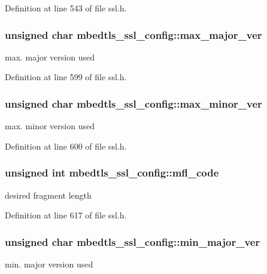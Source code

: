 Definition at line 543 of file ssl.\-h.

\hypertarget{structmbedtls__ssl__config_a10a7ca31f5096d71fc9effbe004d3fd8}{
\subsubsection[{max\-\_\-major\-\_\-ver}]{\setlength{\rightskip}{0pt plus 5cm}unsigned char mbedtls\-\_\-ssl\-\_\-config\-::max\-\_\-major\-\_\-ver}}\label{structmbedtls__ssl__config_a10a7ca31f5096d71fc9effbe004d3fd8}
max. major version used 

Definition at line 599 of file ssl.\-h.

\hypertarget{structmbedtls__ssl__config_a5cd10b5cbe18392c64fa6831cb222243}{
\subsubsection[{max\-\_\-minor\-\_\-ver}]{\setlength{\rightskip}{0pt plus 5cm}unsigned char mbedtls\-\_\-ssl\-\_\-config\-::max\-\_\-minor\-\_\-ver}}\label{structmbedtls__ssl__config_a5cd10b5cbe18392c64fa6831cb222243}
max. minor version used 

Definition at line 600 of file ssl.\-h.

\hypertarget{structmbedtls__ssl__config_a67e52d2668c7f4bc4f6a872c35a679ab}{
\subsubsection[{mfl\-\_\-code}]{\setlength{\rightskip}{0pt plus 5cm}unsigned int mbedtls\-\_\-ssl\-\_\-config\-::mfl\-\_\-code}}\label{structmbedtls__ssl__config_a67e52d2668c7f4bc4f6a872c35a679ab}
desired fragment length 

Definition at line 617 of file ssl.\-h.

\hypertarget{structmbedtls__ssl__config_ae349313f286e0e79d21d18fe40fba06f}{
\subsubsection[{min\-\_\-major\-\_\-ver}]{\setlength{\rightskip}{0pt plus 5cm}unsigned char mbedtls\-\_\-ssl\-\_\-config\-::min\-\_\-major\-\_\-ver}}\label{structmbedtls__ssl__config_ae349313f286e0e79d21d18fe40fba06f}
min. major version used 

